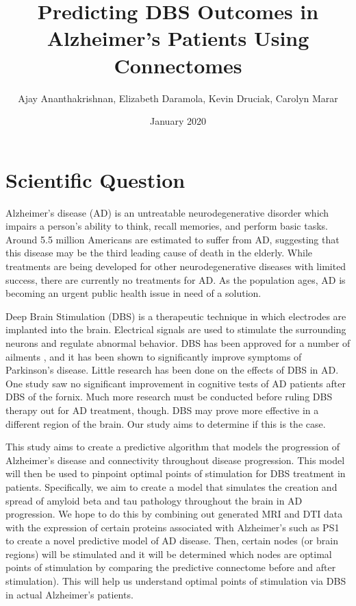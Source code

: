 \documentclass{article}
\title{Predicting DBS Outcomes in Alzheimer's Patients Using Connectomes}
\author{Ajay Ananthakrishnan, Elizabeth Daramola, Kevin Druciak, Carolyn Marar }
\date{January 2020}
\begin{document}
\maketitle

\section{Scientific Question}
Alzheimer's disease (AD) is an untreatable neurodegenerative disorder which impairs a person's ability to think, recall memories, and perform basic tasks. Around 5.5 million Americans are estimated to suffer from AD, suggesting that this disease may be the third leading cause of death in the elderly. \cite{Alzheimer's Facts} While treatments are being developed for other neurodegenerative diseases with limited success, there are currently no treatments for AD. As the population ages, AD is becoming an urgent public health issue in need of a solution.

Deep Brain Stimulation (DBS) is a therapeutic technique in which electrodes are implanted into the brain. Electrical signals are used to stimulate the surrounding neurons and regulate abnormal behavior. DBS has been approved for a number of ailments \cite{DBS uses}, and it has been shown to significantly improve symptoms of Parkinson's disease. \cite{DBS PD} Little research has been done on the effects of DBS in AD. One study saw no significant improvement in cognitive tests of AD patients after DBS of the fornix. \cite{DBS AD} Much more research must be conducted before ruling DBS therapy out for AD treatment, though. DBS may prove more effective in a different region of the brain. Our study aims to determine if this is the case.

This study aims to create a predictive algorithm that models the progression of Alzheimer’s disease and connectivity throughout disease progression. This model will then be used to pinpoint optimal points of stimulation for DBS treatment in patients. Specifically, we aim to create a model that simulates the creation and spread of amyloid beta and tau pathology throughout the brain in AD progression. We hope to do this by combining out generated MRI and DTI data with the expression of certain proteins associated with Alzheimer’s such as PS1 to create a novel predictive model of AD disease. Then, certain nodes (or brain regions) will be stimulated and it will be determined which nodes are optimal points of stimulation by comparing the predictive connectome before and after stimulation). This will help us understand optimal points of stimulation via DBS in actual Alzheimer’s patients.
\end{document}
